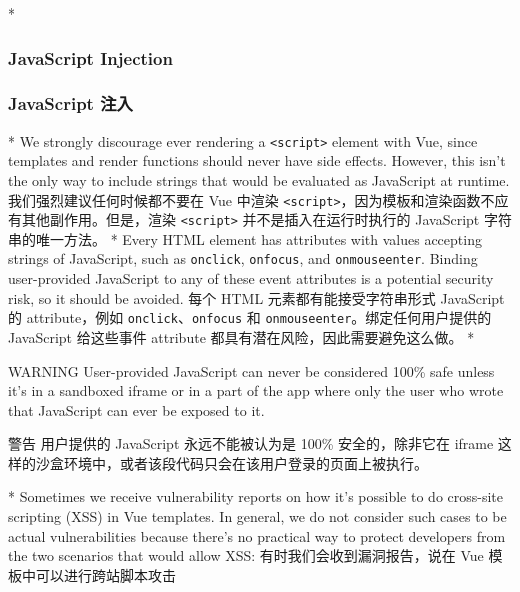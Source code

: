 \begin{paracol}{2} 
 
\switchcolumn[0]*%
\subsubsection{JavaScript Injection}
\switchcolumn
\subsubsection{JavaScript 注入}
\switchcolumn[0]*%
We strongly discourage ever rendering a
\texttt{\textless{}script\textgreater{}} element with Vue, since
templates and render functions should never have side effects. However,
this isn't the only way to include strings that would be evaluated as
JavaScript at runtime.
\switchcolumn
我们强烈建议任何时候都不要在 Vue 中渲染
\texttt{\textless{}script\textgreater{}}，因为模板和渲染函数不应有其他副作用。但是，渲染
\texttt{\textless{}script\textgreater{}} 并不是插入在运行时执行的
JavaScript 字符串的唯一方法。
\switchcolumn[0]*%
Every HTML element has attributes with values accepting strings of
JavaScript, such as \texttt{onclick}, \texttt{onfocus}, and
\texttt{onmouseenter}. Binding user-provided JavaScript to any of these
event attributes is a potential security risk, so it should be avoided.
\switchcolumn
每个 HTML 元素都有能接受字符串形式 JavaScript 的 attribute，例如
\texttt{onclick}、\texttt{onfocus} 和
\texttt{onmouseenter}。绑定任何用户提供的 JavaScript 给这些事件
attribute 都具有潜在风险，因此需要避免这么做。
\switchcolumn[0]*%
\begin{vueQuoteWarn}{WARNING}
User-provided JavaScript can never be considered 100\% safe unless it's
in a sandboxed iframe or in a part of the app where only the user who
wrote that JavaScript can ever be exposed to it.
\end{vueQuoteWarn}
\switchcolumn
\begin{vueQuoteWarn}{警告}
用户提供的 JavaScript 永远不能被认为是 100\% 安全的，除非它在 iframe
这样的沙盒环境中，或者该段代码只会在该用户登录的页面上被执行。
\end{vueQuoteWarn}
\switchcolumn[0]*%
Sometimes we receive vulnerability reports on how it's possible to do
cross-site scripting (XSS) in Vue templates. In general, we do not
consider such cases to be actual vulnerabilities because there's no
practical way to protect developers from the two scenarios that would
allow XSS:
\switchcolumn
有时我们会收到漏洞报告，说在 Vue 模板中可以进行跨站脚本攻击

\end{paracol}
